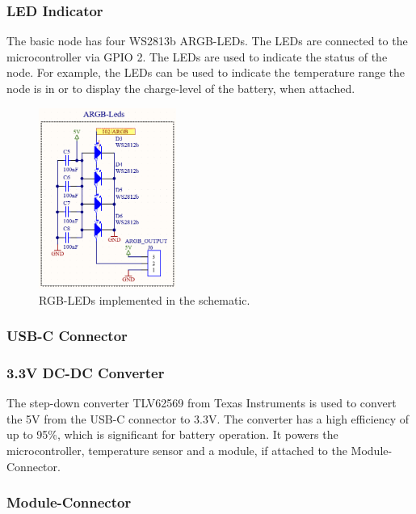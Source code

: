     \subsubsection{LED Indicator}
        The basic node has four WS2813b ARGB-LEDs. The LEDs are connected to the 
        microcontroller via GPIO 2. The LEDs are used to indicate the status of the node. 
        For example, the LEDs can be used to indicate the temperature range the node is in
        or to display the charge-level of the battery, when attached.

        \begin{figure}[H]
            \centering
            \includegraphics[width=0.4\textwidth]{assets/HW/RGB-LED-schematic.png}
            \caption{RGB-LEDs implemented in the schematic.}
        \end{figure}

    \subsubsection{USB-C Connector}

    \subsubsection{3.3V DC-DC Converter}

    The  step-down converter TLV62569 from Texas Instruments is used to convert 
    the 5V from the USB-C connector to 3.3V. The converter has a high efficiency
    of up to 95\%, which is significant for battery operation. It powers the
    microcontroller, temperature sensor and a module, if attached to the
    Module-Connector.

    \subsubsection{Module-Connector}

